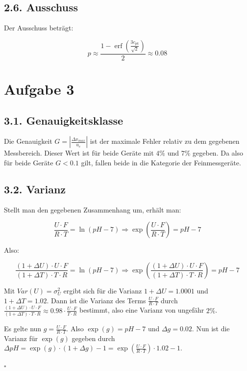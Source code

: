 \documentclass[12pt,a4paper]{article}
\DeclareMathOperator\erf{erf}
\begin{document}
\subsection*{2.6. Ausschuss}
Der Ausschuss beträgt:

\[
p \approx \frac{1 - \erf\left(\frac{3 c_{pk}}{\sqrt{2}}\right)}{2} \approx 0.08
\]

\pagebreak
\section*{Aufgabe 3}
\subsection*{3.1. Genauigkeitsklasse}
Die Genauigkeit $G = \left| \frac{\Delta x_{max}}{u_e} \right|$ ist der maximale Fehler relativ zu dem gegebenen Messbereich. Dieser Wert ist für beide Geräte mit $4\%$ und $7\%$ gegeben. Da also für beide Geräte $G < 0.1$ gilt, fallen beide in die Kategorie der Feinmessgeräte.

\subsection*{3.2. Varianz}
Stellt man den gegebenen Zusammenhang um, erhält man:

\[
\frac{U \cdot F}{R \cdot T} = \ln(pH - 7) \Rightarrow \exp\left(\frac{U \cdot F}{R \cdot T}\right) = pH - 7
\]

Also:

\[
\frac{(1 + \Delta U) \cdot U \cdot F}{(1 + \Delta T) \cdot T \cdot R} = \ln(pH - 7) \Rightarrow \exp\left(\frac{(1 + \Delta U) \cdot U \cdot F}{(1 + \Delta T) \cdot T \cdot R}\right) = pH - 7
\]

Mit $Var(U) = \sigma_U^2$ ergibt sich für die Varianz $1 + \Delta U = 1.0001$ und $1 + \Delta T = 1.02$. Dann ist die Varianz des Terms $\frac{U \cdot F}{R \cdot T}$ durch $\frac{(1 + \Delta U) \cdot U \cdot F}{(1 + \Delta T) \cdot T \cdot R} \approx 0.98 \cdot \frac{U \cdot F}{T \cdot R}$ bestimmt, also eine Varianz von ungefähr $2\%$.

Es gelte nun $g = \frac{U \cdot F}{R \cdot T}$. Also $\exp(g) = pH - 7$ und $\Delta g = 0.02$. Nun ist die Varianz für $\exp(g)$ gegeben durch $\Delta pH = \exp(g) \cdot (1 + \Delta g) - 1 = \exp\left(\frac{U \cdot F}{R \cdot T}\right) \cdot 1.02 -1$.
\begin{flushright}
$\square$
\end{flushright}
\end{document}
